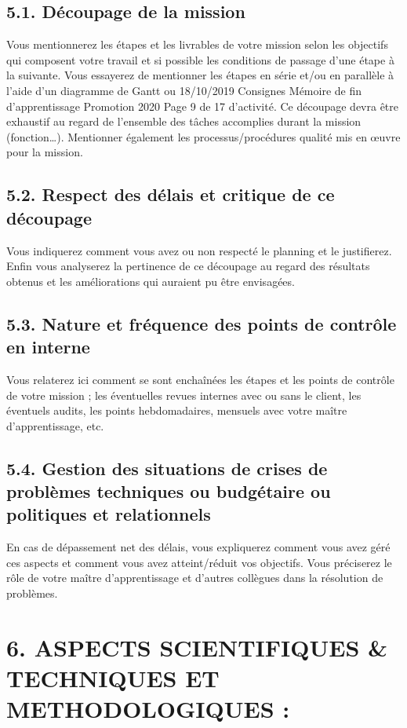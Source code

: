 \documentclass[a4paper, 12pt]{article}
\begin{document}
\subsection{5.1. Découpage de la mission}

Vous mentionnerez les étapes et les livrables de votre mission selon les objectifs qui composent
votre travail et si possible les conditions de passage d’une étape à la suivante. Vous essayerez
de mentionner les étapes en série et/ou en parallèle à l’aide d’un diagramme de Gantt ou
18/10/2019 Consignes Mémoire de fin d'apprentissage Promotion 2020 Page 9 de 17
d’activité. Ce découpage devra être exhaustif au regard de l’ensemble des tâches accomplies
durant la mission (fonction…).
Mentionner également les processus/procédures qualité mis en œuvre pour la mission.

\subsection{5.2. Respect des délais et critique de ce découpage}

Vous indiquerez comment vous avez ou non respecté le planning et le justifierez. Enfin vous
analyserez la pertinence de ce découpage au regard des résultats obtenus et les améliorations
qui auraient pu être envisagées.

\subsection{5.3. Nature et fréquence des points de contrôle en interne}

Vous relaterez ici comment se sont enchaînées les étapes et les points de contrôle de votre
mission ; les éventuelles revues internes avec ou sans le client, les éventuels audits, les points
hebdomadaires, mensuels avec votre maître d’apprentissage, etc.

\subsection{5.4. Gestion des situations de crises de problèmes techniques ou budgétaire ou politiques et relationnels}

En cas de dépassement net des délais, vous expliquerez comment vous avez géré ces aspects
et comment vous avez atteint/réduit vos objectifs. Vous préciserez le rôle de votre maître
d’apprentissage et d’autres collègues dans la résolution de problèmes.

\newpage{}
\section{6. ASPECTS SCIENTIFIQUES \& TECHNIQUES ET METHODOLOGIQUES :}
\end{document}
